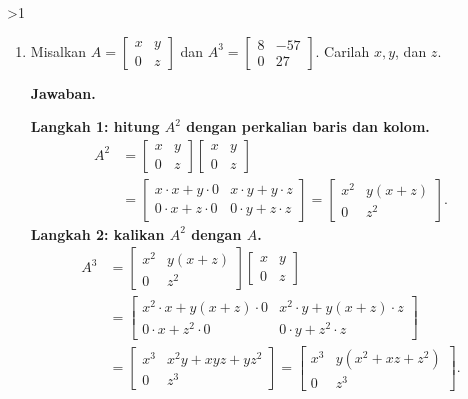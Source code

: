 \documentclass[12pt]{article}
\newcommand{\answername}{Jawaban}
\newenvironment{soaljawab}[1]{%
    \ifnum#1>1\clearpage\fi
    \begin{tcolorbox}[enhanced,breakable,height fill,height fixed for=all,
        sharp corners,colback=white,colframe=black,boxrule=0.4bp,
        boxsep=0pt,left=12bp,right=12bp,top=6bp,bottom=10bp,
        before skip=0pt,after skip=0pt,pad at break=8bp]
    \fontsize{12bp}{14bp}\selectfont
    \setlength{\abovedisplayskip}{8bp}
    \setlength{\belowdisplayskip}{8bp}
    \setlength{\abovedisplayshortskip}{8bp}
    \setlength{\belowdisplayshortskip}{8bp}
    \renewcommand{\arraystretch}{1.15}
    \begin{enumerate}[start=#1,topsep=0pt]
}{%
    \end{enumerate}
    \end{tcolorbox}
}
\newcommand{\jawaban}{\par\medskip\textbf{\answername.}\par\smallskip}
\begin{document}
\begin{soaljawab}{5}
\item Misalkan $A = \begin{bmatrix} x & y \\ 0 & z \end{bmatrix}$ dan $A^3 = \begin{bmatrix} 8 & -57 \\ 0 & 27 \end{bmatrix}$. Carilah $x, y$, dan $z$.
\jawaban
\textbf{Langkah 1: hitung $A^2$ dengan perkalian baris dan kolom.}
\begin{align*}
    A^2
    &=\begin{bmatrix}x&y\\0&z\end{bmatrix}
      \begin{bmatrix}x&y\\0&z\end{bmatrix}\\
    &=\begin{bmatrix}
        x\cdot x+y\cdot0 & x\cdot y+y\cdot z\\
        0\cdot x+z\cdot0 & 0\cdot y+z\cdot z
      \end{bmatrix}
     =\begin{bmatrix}x^2&y(x+z)\\0&z^2\end{bmatrix}.
\end{align*}
\textbf{Langkah 2: kalikan $A^2$ dengan $A$.}
\begin{align*}
    A^3
    &=\begin{bmatrix}x^2&y(x+z)\\0&z^2\end{bmatrix}
      \begin{bmatrix}x&y\\0&z\end{bmatrix}\\
    &=\begin{bmatrix}
        x^2\cdot x+y(x+z)\cdot0 & x^2\cdot y+y(x+z)\cdot z\\
        0\cdot x+z^2\cdot0 & 0\cdot y+z^2\cdot z
      \end{bmatrix}\\
    &=\begin{bmatrix}x^3&x^2y+xyz+yz^2\\0&z^3\end{bmatrix}
     =\begin{bmatrix}x^3&y(x^2+xz+z^2)\\0&z^3\end{bmatrix}.

\end{align*}
\end{soaljawab}
\end{document}
